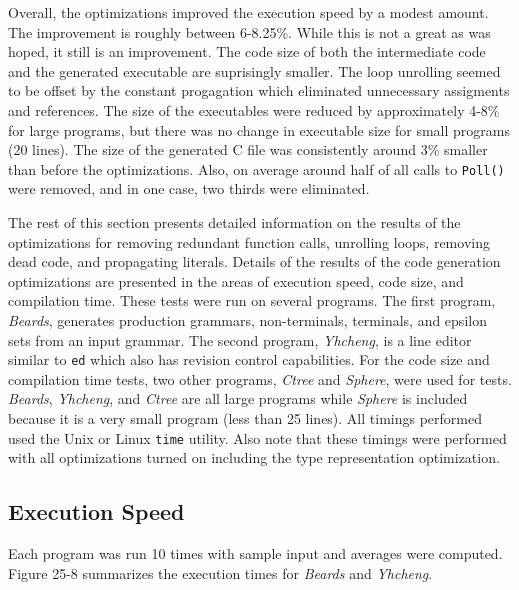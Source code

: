 Overall, the optimizations improved the execution speed by a modest
amount. The improvement is roughly between 6-8.25\%.  While this is
not a great as was hoped, it still is an improvement. The code size of
both the intermediate code and the generated executable are
suprisingly smaller. The loop unrolling seemed to be offset by the
constant progagation which eliminated unnecessary assigments and
references. The size of the executables were reduced by approximately
4-8\% for large programs, but there was no change in executable size
for small programs (20 lines). The size of the generated C file was
consistently around 3\% smaller than before the optimizations.
Also, on average around half of all calls to \texttt{Poll()} were
removed, and in one case, two thirds were eliminated.

The rest of this section presents detailed information on the results of the
optimizations for removing redundant function calls, unrolling loops,
removing dead code, and propagating literals.  Details of the results
of the code generation optimizations are presented in the areas of
execution speed, code size, and compilation time. These tests were run
on several programs. The first program, \textit{Beards}, generates
production grammars, non-terminals, terminals, and epsilon sets from
an input grammar. The second program, \textit{Yhcheng}, is a line
editor similar to \texttt{ed} which also has revision control
capabilities. For the code size and compilation time tests, two other
programs, \textit{Ctree} and \textit{Sphere}, were used for
tests. \textit{Beards}, \textit{Yhcheng}, and \textit{Ctree} are all
large programs while \textit{Sphere} is included because it is a very
small program (less than 25 lines).  All timings performed used the
Unix or Linux \texttt{time} utility.  Also note that these timings
were performed with all optimizations turned on including the type
representation optimization.

\subsection{Execution Speed}

Each program was run 10 times with sample input and averages were
computed. Figure 25-8 summarizes the execution times for
\textit{Beards} and \textit{Yhcheng}.

